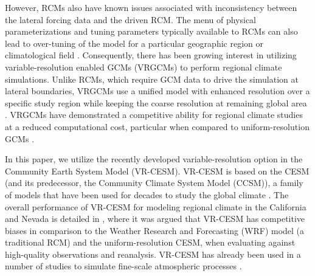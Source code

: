 \documentclass{ametsoc}
\begin{document}


However, RCMs also have known issues associated with inconsistency between the lateral forcing data and the driven RCM.  The menu of physical parameterizations and tuning parameters typically available to RCMs can also lead to over-tuning of the model for a particular geographic region or climatological field \citep{mcdonald2003transparent, laprise2008challenging, mesinger2013limited}.  Consequently, there has been growing interest in utilizing variable-resolution enabled GCMs (VRGCMs) to perform regional climate simulations. Unlike RCMs, which require GCM data to drive the simulation at lateral boundaries, VRGCMs use a unified model with enhanced resolution over a specific study region while keeping the coarse resolution at remaining global area \citep{staniforth1978variable, fox1997finite}. VRGCMs have demonstrated a competitive ability for regional climate studies at a reduced computational cost, particular when compared to uniform-resolution GCMs \citep{fox2006variable, rauscher2013exploring}.


In this paper, we utilize the recently developed variable-resolution option in the Community Earth System Model (VR-CESM).  VR-CESM is based on the CESM (and its predecessor, the Community Climate System Model (CCSM)), a family of models that have been used for decades to study the global climate \citep{neale2010description, hurrell2013community}.  The overall performance of VR-CESM for modeling regional climate in the California and Nevada is detailed in \cite{huang2016evaluation}, where it was argued that VR-CESM has competitive biases in comparison to the Weather Research and Forecasting (WRF) model (a traditional RCM) and the uniform-resolution CESM, when evaluating against high-quality observations and reanalysis. VR-CESM has already been used in a number of studies to simulate fine-scale atmospheric processes  \citep{zarzycki2014using, zarzycki2015effects, rhoades2016characterizing, huang2016irrigation, rhoades2017projecting}.
\end{document}
